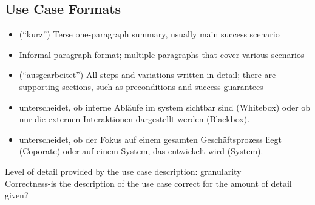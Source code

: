 \subsection{Use Case Formats}
\begin{itemize}
    \item {} (\enquote{kurz}) Terse one-paragraph summary, usually main success scenario
    \item {} Informal paragraph format; multiple paragraphs that cover various scenarios 
    \item {} (\enquote{ausgearbeitet}) All steps and variations written in detail; there are supporting sections, such as preconditions and success guarantees
\end{itemize}
\begin{infoBox}
    \begin{itemize}
        \item {} unterscheidet, ob interne Abläufe im system sichtbar sind (Whitebox) oder ob nur die externen Interaktionen dargestellt werden (Blackbox).
        \item {} unterscheidet, ob der Fokus auf einem gesamten Geschäftsprozess liegt (Coporate) oder auf einem System, das entwickelt wird (System).
    \end{itemize}
\end{infoBox}
\begin{defBox}[title=Precision vs. Accuracy (\enquote{Detaillierungsgrad} bzw. \enquote{Zutreffendheit})]
     Level of detail provided by the use case description: granularity\\
     Correctness-is the description of the use case correct for the amount of detail given?
\end{defBox}
